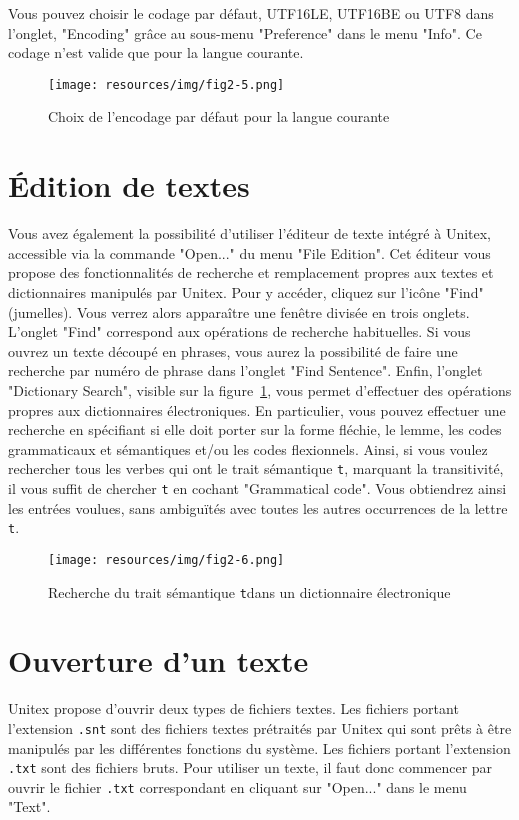 \bigskip
\noindent 
Vous pouvez choisir le codage par défaut, UTF16LE, UTF16BE ou UTF8 dans l'onglet, "Encoding" grâce
au sous-menu "Preference"  dans le menu "Info". Ce codage n'est valide que pour la langue
courante.

\begin{figure}[!ht]
\begin{center}
\texttt{[image: resources/img/fig2-5.png]}
\caption{Choix de l'encodage par défaut pour la langue courante}
\end{center}
\end{figure}

\section{Édition de textes}
Vous avez également la possibilité d’utiliser l’éditeur de texte intégré à Unitex, accessible
via la commande "Open..." du menu "File Edition". Cet éditeur vous propose des fonctionnalités
de recherche et remplacement propres aux textes et dictionnaires manipulés par Unitex. Pour y
accéder, cliquez sur l’icône "Find" (jumelles). Vous verrez alors apparaître une fenêtre divisée en
trois onglets. L’onglet "Find" correspond aux opérations de recherche habituelles. Si vous ouvrez un
texte découpé en phrases, vous aurez la possibilité de faire une recherche par numéro de phrase dans
l’onglet "Find Sentence". Enfin, l’onglet "Dictionary Search", visible sur la
figure~\ref{dictionary-search}, vous permet d’effectuer des opérations propres aux dictionnaires
électroniques. En particulier, vous pouvez effectuer une recherche en spécifiant si elle doit porter
sur la forme fléchie, le lemme, les codes grammaticaux et sémantiques et/ou les codes flexionnels.
Ainsi, si vous voulez rechercher tous les verbes qui ont le trait sémantique
\verb$t$, marquant la transitivité, il vous suffit de chercher \verb$t$ en cochant
"Grammatical code". Vous obtiendrez ainsi les entrées voulues, sans ambiguïtés avec toutes les
autres occurrences de la lettre \verb$t$.


\begin{figure}[!ht]
\begin{center}
\texttt{[image: resources/img/fig2-6.png]}
\caption{Recherche du trait sémantique \texttt{t}dans un dictionnaire
électronique\label{dictionary-search}}
\end{center}
\end{figure}


\section{Ouverture d’un texte}
\noindent Unitex propose d’ouvrir deux types de fichiers textes. 
Les fichiers portant l’extension \verb+.snt+ sont des fichiers textes prétraités 
par Unitex qui sont prêts à être manipulés par les différentes fonctions du système.
Les fichiers portant l’extension \verb+.txt+ sont des fichiers bruts.
Pour utiliser un texte, il faut donc commencer par ouvrir le fichier  \verb+.txt+
correspondant en cliquant sur "Open..." dans le menu "Text".


